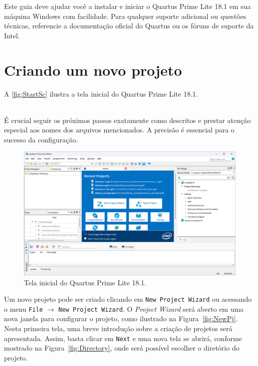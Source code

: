 \documentclass[12pt,a4paper]{article}
\newcommand{\Version}{18.1}
\newcommand{\Atention}[1]{
    \begin{tcolorbox}[colback=red!5!white,colframe=red!75!black]
    \begin{center}
    \faExclamationTriangle{}\\#1
    \end{center}
    \end{tcolorbox}
}
\begin{document}
Este guia deve ajudar você a instalar e iniciar o Quartus Prime Lite \Version{} em sua máquina Windows com facilidade. Para qualquer suporte adicional ou questões técnicas, referencie a documentação oficial do Quartus ou os fóruns de suporte da Intel.


\section{Criando um novo projeto}

A \autoref{fig:StartSc} ilustra a tela inicial do Quartus Prime Lite \Version.

\Atention{É crucial seguir os próximos passos exatamente como descritos e prestar atenção especial aos nomes dos arquivos mencionados. A precisão é essencial para o sucesso da configuração.}

\begin{figure}[htbp]
    \centering
    \includegraphics[width=\textwidth]{./figs/StartSc.png}
    \caption{Tela inicial do Quartus Prime Lite \Version.}
    \label{fig:StartSc}
\end{figure}

Um novo projeto pode ser criado clicando em \texttt{New Project Wizard} ou acessando o menu \texttt{File} $\rightarrow$ \texttt{New Project Wizard}. O \textit{Project Wizard} será aberto em uma nova janela para configurar o projeto, como ilustrado na Figura~\ref{fig:NewPj}. Nesta primeira tela, uma breve introdução sobre a criação de projetos será apresentada. Assim, basta clicar em \texttt{Next} e uma nova tela se abrirá, conforme mostrado na Figura~\ref{fig:Directory}, onde será possível escolher o diretório do projeto.
\end{document}
